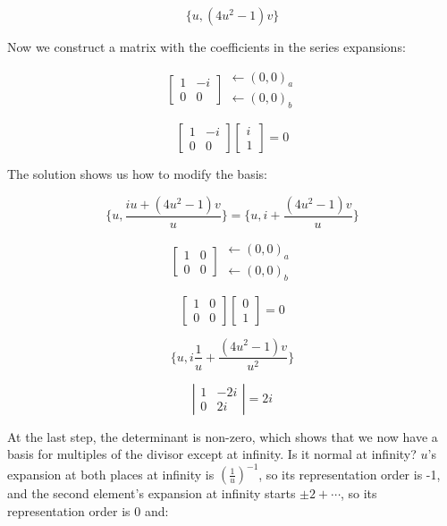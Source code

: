 $$\{u, (4u^2-1)v\}$$

Now we construct a matrix with the coefficients in the series expansions:

$$\left[ \begin{array}{cc} 1 & -i \\ 0 & 0 \end{array} \right] \begin{array}{ll} \leftarrow (0,0)_a \\ \leftarrow (0,0)_b \end{array} $$

$$\left[ \begin{array}{cc} 1 & -i \\ 0 & 0 \end{array} \right] \left[ \begin{array}{c} i \\ 1 \end{array} \right] = 0$$

The solution shows us how to modify the basis:

$$\{u, \frac{iu + (4u^2-1)v}{u}\} = \{u, i + \frac{(4u^2-1)v}{u}\}$$

$$\left[ \begin{array}{cc} 1 & 0 \\ 0 & 0 \end{array} \right] \begin{array}{ll} \leftarrow (0,0)_a \\ \leftarrow (0,0)_b \end{array} $$

$$\left[ \begin{array}{cc} 1 & 0 \\ 0 & 0 \end{array} \right] \left[ \begin{array}{c} 0 \\ 1 \end{array} \right] = 0$$

$$\{u, i\frac{1}{u} + \frac{(4u^2-1)v}{u^2}\}$$

$$\left| \begin{array}{cc} 1 & -2i \\ 0 & 2i \end{array} \right| = 2i$$

At the last step, the determinant is non-zero, which shows that we
now have a basis for multiples of the divisor except at infinity.
Is it normal at infinity?  $u$'s expansion at both places at infinity
is $\left(\frac{1}{u}\right)^{-1}$, so its representation order is -1,
and the second element's expansion at infinity starts $\pm 2 + \cdots$,
so its representation order is 0 and:

